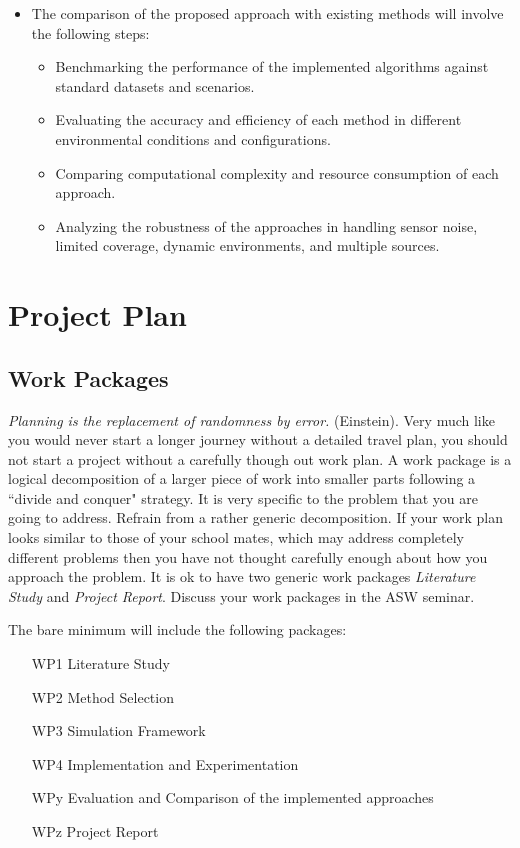 \documentclass[rnd]{mas_proposal}
\begin{document}
\begin{itemize}
\begin{itemize}
    \end{itemize}
    \item The comparison of the proposed approach with existing methods will involve the following steps:
    \begin{itemize}
        \item Benchmarking the performance of the implemented algorithms against standard datasets and scenarios.
        \item Evaluating the accuracy and efficiency of each method in different environmental conditions and configurations.
        \item Comparing computational complexity and resource consumption of each approach.
        \item Analyzing the robustness of the approaches in handling sensor noise, limited coverage, dynamic environments, and multiple sources.
    \end{itemize}
\end{itemize}

\section{Project Plan}

\subsection{Work Packages}
\emph{Planning is the replacement of randomness by error.} (Einstein). Very much like you would never start a longer journey without a detailed travel plan, you should not start a project without a carefully though out work plan. A work package is a logical decomposition of a larger piece of work into smaller parts following a ``divide and conquer" strategy. It is very specific to the problem that you are going to address. Refrain from a rather generic decomposition. If your work plan looks similar to those of your school mates, which may address completely different problems then you have not thought carefully enough about how you approach the problem. It is ok to have two generic work packages \emph{Literature Study} and \emph{Project Report}. Discuss your work packages in the ASW seminar.

The bare minimum will include the following packages:
\begin{enumerate}
    \item[WP1] Literature Study
    \item[WP2] Method Selection
    \item[WP3] Simulation Framework
    \item[WP4] Implementation and Experimentation
    \item[WPy] Evaluation and Comparison of the implemented approaches
    \item[WPz] Project Report
\end{enumerate}
\end{document}
